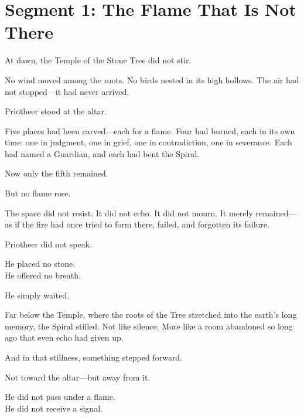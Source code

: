 \documentclass[9pt]{article}
\begin{document}
\newpage

\section*{Segment 1: The Flame That Is Not There}

At dawn, the Temple of the Stone Tree did not stir.

\vspace{0.5em}
No wind moved among the roots. No birds nested in its high hollows. The air had not stopped---it had never arrived.

\vspace{0.5em}
Priotheer stood at the altar.

\vspace{0.5em}
Five places had been carved---each for a flame. Four had burned, each in its own time: one in judgment, one in grief, one in contradiction, one in severance. Each had named a Guardian, and each had bent the Spiral.

\vspace{0.5em}
Now only the fifth remained.

\vspace{0.5em}
But no flame rose.

\vspace{0.5em}
The space did not resist. It did not echo. It did not mourn. It merely remained---as if the fire had once tried to form there, failed, and forgotten its failure.

\vspace{0.5em}
Priotheer did not speak.

\vspace{0.5em}
He placed no stone.\\
He offered no breath.

\vspace{0.5em}
He simply waited.

\vspace{0.5em}
Far below the Temple, where the roots of the Tree stretched into the earth’s long memory, the Spiral stilled. Not like silence. More like a room abandoned so long ago that even echo had given up.

\vspace{0.5em}
And in that stillness, something stepped forward.

\vspace{0.5em}
Not toward the altar---but away from it.

\vspace{0.5em}
He did not pass under a flame.\\
He did not receive a signal.
\end{document}
